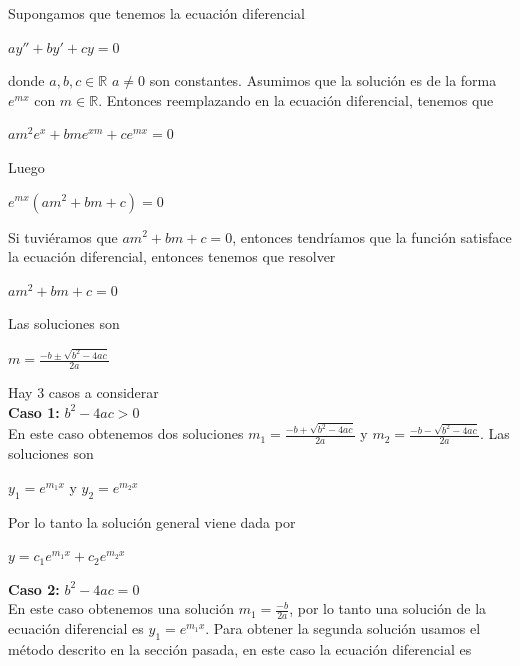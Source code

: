 \documentclass{article}
\theoremstyle{plain}
\theoremstyle{definition}
\begin{document}
Supongamos que tenemos la ecuación diferencial

\begin{center}
$ay''+by'+cy=0$
\end{center}

donde $a,b,c \in \mathbb{R}$ $a \neq 0$ son constantes. Asumimos que la solución es de la forma $e^{mx}$ con $m \in\mathbb{R}$. Entonces reemplazando en la ecuación diferencial, tenemos que



\begin{center}
$am^2e^x+bme^{xm}+ce^{mx}=0$
\end{center}


Luego


\begin{center}
$e^{mx}(am^2+bm+c)=0$
\end{center}

Si tuviéramos que $am^2+bm+c=0$, entonces tendríamos que la función satisface la ecuación diferencial, entonces tenemos que resolver


\begin{center}
$am^2+bm+c =0$
\end{center}

Las soluciones son

\begin{center}
$\displaystyle m = \frac{-b \pm \sqrt{b^2-4ac}}{2a}$
\end{center}


Hay 3 casos a considerar \\


\textbf{Caso 1: } $b^2-4ac >0$ \\

En este caso obtenemos dos soluciones $m_1 = \displaystyle  \frac{-b + \sqrt{b^2-4ac}}{2a}$ y $\displaystyle m_2 = \frac{-b - \sqrt{b^2-4ac}}{2a}$. Las soluciones son

\begin{center}
$y_1 = e^{m_1x}$ y $y_2 = e^{m_2x}$
\end{center}

Por lo tanto la solución general viene dada por

\begin{center}
$y=c_1e^{m_1x}+c_2e^{m_2 x}$
\end{center}


\textbf{Caso 2: } $b^2-4ac =0$ \\

En este caso obtenemos una solución $m_1 = \displaystyle  \frac{-b}{2a}$, por lo tanto una solución de la ecuación diferencial es $y_1= e^{m_1x}$. Para obtener la segunda solución usamos el método descrito en la sección pasada, en este caso la ecuación diferencial es
\end{document}
